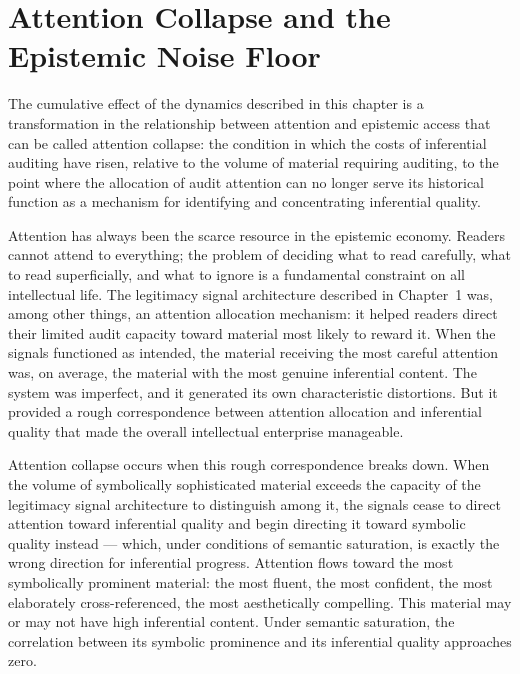 \documentclass[12pt, openright, twoside]{book}
\begin{document}
\section{Attention Collapse and the Epistemic Noise Floor}

The cumulative effect of the dynamics described in this chapter is
a transformation in the relationship between attention and
epistemic access that can be called attention collapse: the
condition in which the costs of inferential auditing have risen,
relative to the volume of material requiring auditing, to the
point where the allocation of audit attention can no longer serve
its historical function as a mechanism for identifying and
concentrating inferential quality.

Attention has always been the scarce resource in the epistemic
economy. Readers cannot attend to everything; the problem of
deciding what to read carefully, what to read superficially, and
what to ignore is a fundamental constraint on all intellectual
life. The legitimacy signal architecture described in Chapter~1
was, among other things, an attention allocation mechanism:
it helped readers direct their limited audit capacity toward
material most likely to reward it. When the signals functioned
as intended, the material receiving the most careful attention
was, on average, the material with the most genuine inferential
content. The system was imperfect, and it generated its own
characteristic distortions. But it provided a rough correspondence
between attention allocation and inferential quality that made
the overall intellectual enterprise manageable.

Attention collapse occurs when this rough correspondence breaks
down. When the volume of symbolically sophisticated material
exceeds the capacity of the legitimacy signal architecture to
distinguish among it, the signals cease to direct attention
toward inferential quality and begin directing it toward symbolic
quality instead --- which, under conditions of semantic saturation,
is exactly the wrong direction for inferential progress. Attention
flows toward the most symbolically prominent material: the most
fluent, the most confident, the most elaborately cross-referenced,
the most aesthetically compelling. This material may or may not
have high inferential content. Under semantic saturation, the
correlation between its symbolic prominence and its inferential
quality approaches zero.
\end{document}
